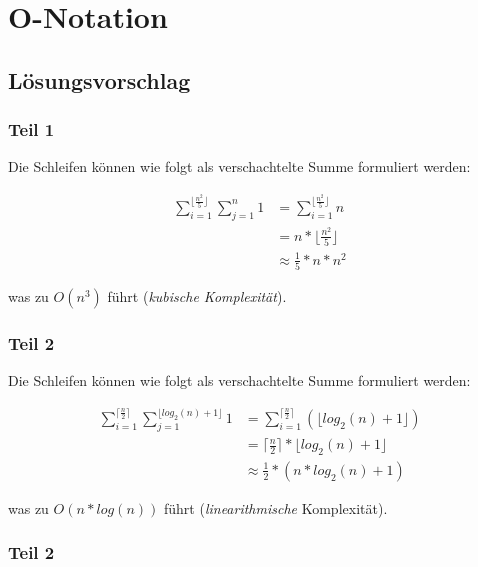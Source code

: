 \chapter{O-Notation}

\section{Lösungsvorschlag}

\subsection{Teil 1}

Die Schleifen können wie folgt als verschachtelte Summe formuliert werden:

\begin{equation}
    \begin{split}
        \sum_{i=1}^{\lfloor \frac{n^2}{5}\rfloor}  \sum_{j = 1}^{n} 1 &= \sum_{i=1}^{\lfloor \frac{n^2}{5} \rfloor}  n\\
        &= n * \lfloor \frac{n^2}{5} \rfloor \\
        & \approx \frac{1}{5} * n * n^2
    \end{split}
\end{equation}

was zu $O(n^3)$ führt (\textit{kubische Komplexität}).

\subsection{Teil 2}

Die Schleifen können wie folgt als verschachtelte Summe formuliert werden:

\begin{equation}
    \begin{split}
        \sum_{i=1}^{\lceil \frac{n}{2}\rceil}  \sum_{j = 1}^{\lfloor log_2(n) + 1 \rfloor} 1 &= \sum_{i=1}^{\lceil \frac{n}{2}\rceil} (\lfloor log_2(n) + 1 \rfloor) \\
        &= \lceil \frac{n}{2}\rceil * \lfloor log_2(n) + 1 \rfloor \\
        & \approx \frac{1}{2} * (n *  log_2(n) + 1)
    \end{split}
\end{equation}

was zu $O(n * log(n))$ führt (\textit{linearithmische} Komplexität).


\subsection{Teil 2}

